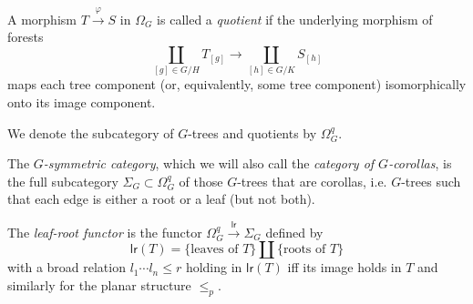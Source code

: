 \documentclass[a4paper,10pt]{article}%
\begin{document}
\begin{definition}
	A morphism $T \xrightarrow{\varphi} S$ in $\Omega_G$ is called a \textit{quotient} if the underlying morphism of forests
	\[\coprod_{[g]\in G/H} {T_{[g]} } 
	\to
	\coprod_{[h]\in G/K} {S_{[h]} } 
	\]
maps each tree component (or, equivalently, some tree component) isomorphically onto its image component.

We denote the subcategory of $G$-trees and quotients by $\Omega_G^q$.
\end{definition}


\begin{definition}
	The \textit{$G$-symmetric category}, which we will also call the \textit{category of $G$-corollas}, is the full subcategory 
	$\Sigma_G \subset \Omega_G^{q}$ of those $G$-trees that are corollas, i.e. $G$-trees such that each edge is either a root or a leaf (but not both).
\end{definition}


\begin{definition}
	The \textit{leaf-root functor} is the functor $\Omega_G^q \xrightarrow{\mathsf{lr}} \Sigma_G$ defined by 
	\[
	 \mathsf{lr}(T)=\{\text{leaves of }T\}\amalg \{\text{roots of }T\}
	\]
	with a broad relation $l_1 \cdots l_n \leq r$ holding in 
	$\mathsf{lr}(T)$ iff its image holds in $T$ and similarly for the planar structure $\leq_p$.
\end{definition}
\end{document}

